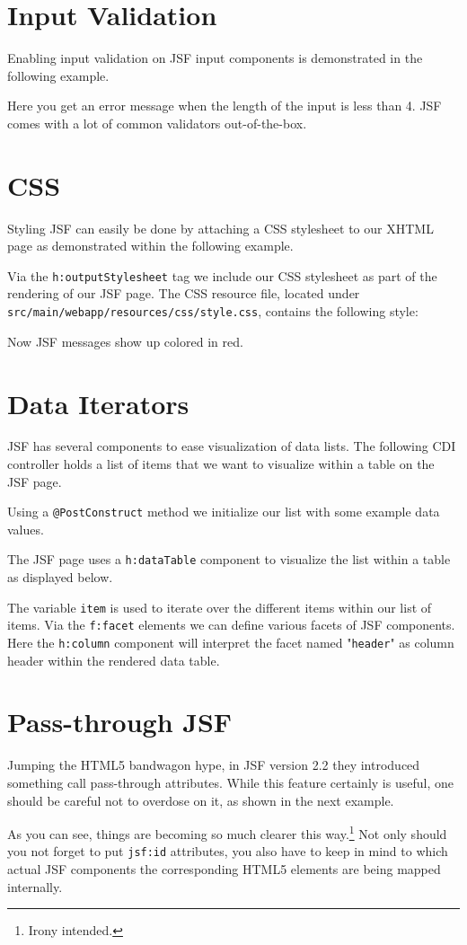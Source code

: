 \section{Input Validation}

Enabling input validation on JSF input components is demonstrated in the following example.

Here you get an error message when the length of the input is less than 4.
JSF comes with a lot of common validators out-of-the-box.

\section{CSS}

Styling JSF can easily be done by attaching a CSS stylesheet to our XHTML page as demonstrated within the following example.

Via the \texttt{h:outputStylesheet} tag we include our CSS stylesheet as part of the rendering of our JSF page.
The CSS resource file, located under
\texttt{src/main/webapp/resources/css/style.css}, contains the following style:

Now JSF messages show up colored in red.

\section{Data Iterators}

JSF has several components to ease visualization of data lists.
The following CDI controller holds a list of items that we want to visualize within a table on the JSF page.

Using a \texttt{@PostConstruct} method we initialize our list with some example data values.

The JSF page uses a \texttt{h:dataTable} component to visualize the list within a table as displayed below.

The variable \texttt{item} is used to iterate over the different items within our list of items.
Via the \texttt{f:facet} elements we can define various facets of JSF components.
Here the \texttt{h:column} component will interpret the facet named "\texttt{header}" as column header within the rendered data table.

\section{Pass-through JSF}
Jumping the HTML5 bandwagon hype, in JSF version 2.2 they introduced something call pass-through attributes.
While this feature certainly is useful, one should be careful not to overdose on it, as shown in the next example.

As you can see, things are becoming so much clearer this way.\footnote{Irony intended.}
Not only should you not forget to put \texttt{jsf:id} attributes,
you also have to keep in mind to which actual JSF components the corresponding HTML5 elements are being mapped internally.

